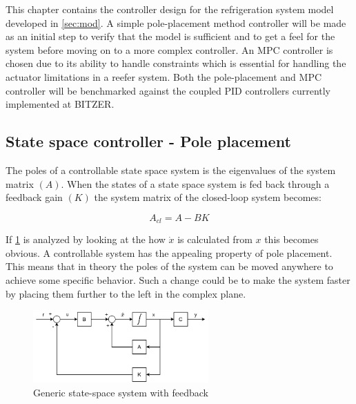 This chapter contains the controller design for the refrigeration system model developed in \cref{sec:mod}. A simple pole-placement method controller will be made as an initial step to verify that the model is sufficient and to get a feel for the system before moving on to a more complex controller. An MPC controller is chosen due to its ability to handle constraints which is essential for handling the actuator limitations in a reefer system. Both the pole-placement and MPC controller will be benchmarked against the coupled PID controllers currently implemented at BITZER.


\subsection{State space controller - Pole placement}
The poles of a controllable state space system is the eigenvalues of the system matrix $(A)$. When the states of a state space system is fed back through a feedback gain $(K)$ the system matrix of the closed-loop system becomes:

\begin{equation} \label{eq:A_cl}
	A_{cl} = A-BK
\end{equation}

If \cref{fig:state_space_fb} is analyzed by looking at the how $\dot{x}$ is calculated from $x$ this becomes obvious. A controllable system has the appealing property of  pole placement. This means that in theory the poles of the system can be moved anywhere to achieve some specific behavior. Such a change could be to make the system faster by placing them further to the left in the complex plane.

\begin{figure}[h!]
	\centering
	\includegraphics[width=0.60\textwidth]{Graphics/State_space_feedback.pdf}
	\caption{Generic state-space system with feedback}
	\label{fig:state_space_fb}
\end{figure}


